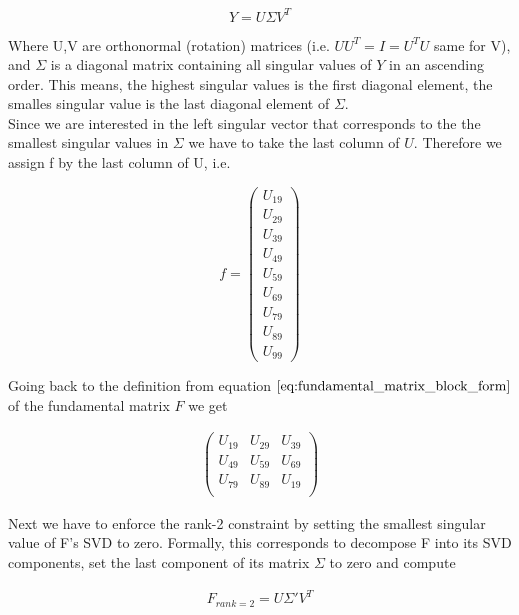 \documentclass{paper}
\begin{document}
\begin{equation}
    Y = U \Sigma V^{T}
\label{eq:svd_y}
\end{equation}

Where U,V are orthonormal (rotation) matrices (i.e. $U U^{T} = I = U^{T} U$ same for V), and $\Sigma$ is a diagonal matrix containing all singular values of $Y$ in an ascending order. This means, the highest singular values is the first diagonal element, the smalles singular value is the last diagonal element of $\Sigma$. \\

Since we are interested in the left singular vector that corresponds to the the smallest singular values in $\Sigma$ we have to take the last column of $U$. Therefore we assign f by the last column of U, i.e. 

\begin{equation}
    f = \left(\begin{array}{c}
U_{19} \\
U_{29} \\
U_{39} \\
U_{49} \\
U_{59} \\
U_{69} \\
U_{79} \\
U_{89} \\
U_{99}
\end{array}
\right)
\end{equation}
 
Going back to the definition from equation $\ref{eq:fundamental_matrix_block_form}$ of the fundamental matrix $F$ we get

\begin{align}
\left(\begin{array}{ccc}
U_{19} & U_{29} & U_{39} \\
U_{49} & U_{59} & U_{69} \\
U_{79} & U_{89} & U_{19} \\
\end{array} \right)
\end{align}


Next we have to enforce the rank-2 constraint by setting the smallest singular value of F's SVD to zero. Formally, this corresponds to decompose F into its SVD components, set the last component of its matrix $\Sigma$ to zero and compute 

\begin{align}
    F_{rank=2} = U \Sigma' V^{T}
\end{align}
\end{document}
